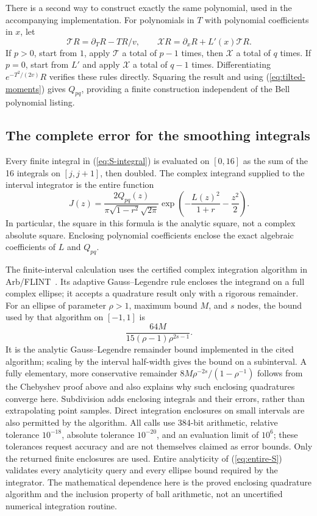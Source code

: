 There is a second way to construct exactly the same polynomial, used in
the accompanying implementation. For polynomials in $T$ with polynomial
coefficients in $x$, let
\[
 \mathcal T R=\partial_T R-TR/v,\qquad
 \mathcal X R=\partial_xR+L'(x)\mathcal T R.
\]
If $p>0$, start from $1$, apply $\mathcal T$ a total of $p-1$ times,
then $\mathcal X$ a total of $q$ times. If $p=0$, start from $L'$ and
apply $\mathcal X$ a total of $q-1$ times. Differentiating
$e^{-T^2/(2v)}R$ verifies these rules directly. Squaring the result and
using (\ref{eq:tilted-moments}) gives $Q_{pq}$, providing a finite
construction independent of the Bell polynomial listing.

\subsection{The complete error for the smoothing integrals}
Every finite integral in (\ref{eq:S-integral}) is evaluated on $[0,16]$
as the sum of the 16 integrals on $[j,j+1]$, then doubled. The complex
integrand supplied to the interval integrator is the entire function
\begin{equation}\label{eq:entire-S}
 J(z)=\frac{2Q_{pq}(z)}{\pi\sqrt{1-r^2}\sqrt{2\pi}}
       \exp\left(-\frac{L(z)^2}{1+r}-\frac{z^2}{2}\right).
\end{equation}
In particular, the square in this formula is the analytic square, not a
complex absolute square. Enclosing polynomial coefficients enclose the
exact algebraic coefficients of $L$ and $Q_{pq}$.

The finite-interval calculation uses the certified complex integration
algorithm in Arb/FLINT~\cite{arb,integration,flintcalc}. Its adaptive
Gauss--Legendre rule encloses the integrand on a full complex ellipse;
it accepts a quadrature result only with a rigorous remainder. For an
ellipse of parameter $\rho>1$, maximum bound $M$, and $s$ nodes, the
bound used by that algorithm on $[-1,1]$ is
\begin{equation}\label{eq:library-error}
 \frac{64M}{15(\rho-1)\rho^{2s-1}}.
\end{equation}
It is the analytic Gauss--Legendre remainder bound implemented in the
cited algorithm; scaling by the interval half-width gives the bound on
a subinterval. A fully elementary, more conservative remainder
$8M\rho^{-2s}/(1-\rho^{-1})$ follows from the Chebyshev proof above and
also explains why such enclosing quadratures converge here. Subdivision
adds enclosing integrals and their errors, rather than extrapolating
point samples. Direct integration enclosures on small intervals are
also permitted by the algorithm. All calls use 384-bit arithmetic,
relative tolerance $10^{-18}$, absolute tolerance $10^{-20}$, and an
evaluation limit of $10^6$; these tolerances request accuracy and are
not themselves claimed as error bounds. Only the returned finite
enclosures are used. Entire analyticity of (\ref{eq:entire-S}) validates
every analyticity query and every ellipse bound required by the
integrator. The mathematical dependence here is the proved enclosing
quadrature algorithm and the inclusion property of ball arithmetic,
not an uncertified numerical integration routine.

